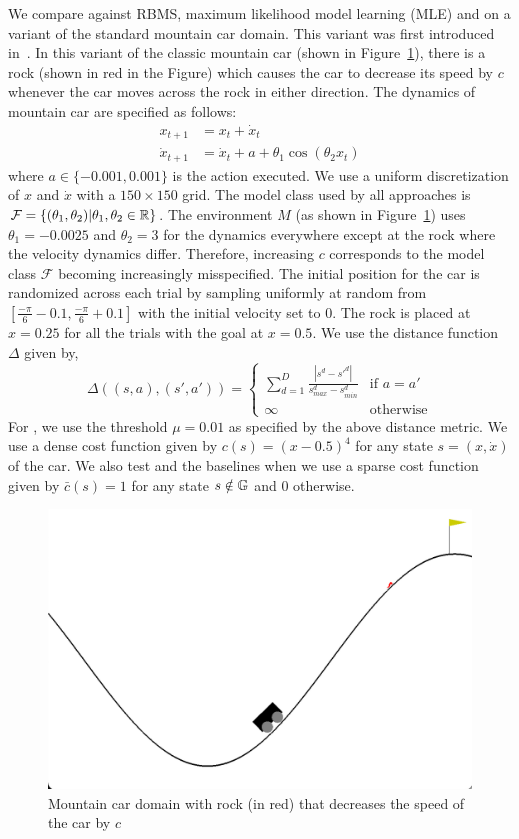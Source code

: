 We compare \taml{} against RBMS, maximum likelihood model learning
(MLE) and \cmax{} on a variant of the standard mountain car
domain. This variant 
was first introduced in~\cite{DBLP:conf/icra/JosephGRHR13}. In this
variant of the classic mountain car (shown in
Figure~\ref{fig:mountaincar}), there is a rock (shown in red in the
Figure) which causes the car to decrease its speed by $c$ whenever the
car moves across the rock in either direction. The dynamics of
mountain car are specified as follows:
\begin{align*}
  x_{t+1} &= x_t + \dot{x}_t \\
  \dot{x}_{t+1} &= \dot{x}_t + a + \theta_1\cos(\theta_2x_t)
\end{align*}
where $a \in \{-0.001, 0.001\}$ is the action executed. We use a
uniform discretization of $x$ and $\dot{x}$ with a $150 \times 150$
grid. The model class used by all approaches is $\mathcal{F} =
\{(\theta_1, \theta_2) | \theta_1, \theta_2 \in \mathbb{R}\}$. The
environment $M$ (as shown in Figure~\ref{fig:mountaincar}) uses
$\theta_1 = -0.0025$ and $\theta_2 = 3$ for the dynamics everywhere
except at the rock where the velocity dynamics differ. Therefore,
increasing $c$ corresponds to the model class $\mathcal{F}$ becoming
increasingly misspecified. The initial position for the car is randomized
across each trial by sampling uniformly at random from
$[\frac{-\pi}{6} - 0.1, \frac{-\pi}{6}+0.1]$ with the initial velocity
set to $0$. The rock is placed at $x = 0.25$ for all the trials with
the goal at $x = 0.5$. We use the distance function $\Delta$ given by,
\begin{equation}
  \label{eq:24}
  \Delta((s, a), (s', a')) =
  \begin{cases}
    \sum_{d=1}^D \frac{|s^d - s'^d|}{s^d_{max} - s^d_{min}} & \text{if
    } a = a' \\
    \infty & \text{otherwise}
  \end{cases}
\end{equation}
For \taml{}, we use the threshold $\mu = 0.01$ as specified by the
above distance metric. We use a dense cost function given by $c(s) =
(x - 0.5)^4$ for any state $s = (x, \dot{x})$ of the car. We also test
\taml{} and the baselines when we use a sparse cost function given by
$\bar{c}(s) = 1$ for any state $s \notin \mathbb{G}$ and $0$ otherwise.
\begin{figure}[t]
  \centering
  \includegraphics[width=0.5\linewidth]{figures/taml/mountaincar.png}
  \caption{Mountain car domain with rock (in red) that decreases the
    speed of the car by $c$}
  \label{fig:mountaincar}
\end{figure}

